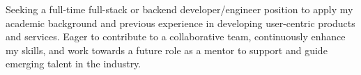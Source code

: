 


\begin{cvparagraph}
  Seeking a full-time full-stack or backend developer/engineer position to apply my academic background and previous experience in developing user-centric products and services. Eager to contribute to a collaborative team, continuously enhance my skills, and work towards a future role as a mentor to support and guide emerging talent in the industry.
\end{cvparagraph}

